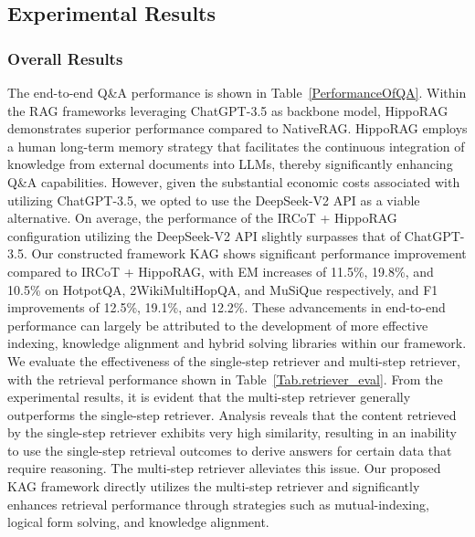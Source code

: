 \documentclass{article}
\begin{document}
\subsection{Experimental Results}

\subsubsection{Overall Results}
The end-to-end Q\&A performance is shown in Table~\ref{PerformanceOfQA}. Within the RAG frameworks leveraging ChatGPT-3.5 as backbone model, HippoRAG demonstrates superior performance compared to NativeRAG. HippoRAG employs a human long-term memory strategy that facilitates the continuous integration of knowledge from external documents into LLMs, thereby significantly enhancing Q\&A capabilities. However, given the substantial economic costs associated with utilizing ChatGPT-3.5, we opted to use the DeepSeek-V2 API as a viable alternative. On average, the performance of the IRCoT + HippoRAG configuration utilizing the DeepSeek-V2 API slightly surpasses that of ChatGPT-3.5. Our constructed framework KAG shows significant performance improvement compared to IRCoT + HippoRAG, with EM increases of 11.5\%, 19.8\%, and 10.5\% on HotpotQA, 2WikiMultiHopQA, and MuSiQue respectively, and F1 improvements of 12.5\%, 19.1\%, and 12.2\%. These advancements in end-to-end performance can largely be attributed to the development of more effective indexing, knowledge alignment and hybrid solving libraries within our framework.
We evaluate the effectiveness of the single-step retriever and multi-step retriever, with the retrieval performance shown in Table~\ref{Tab.retriever_eval}. From the experimental results, it is evident that the multi-step retriever generally outperforms the single-step retriever. Analysis reveals that the content retrieved by the single-step retriever exhibits very high similarity, resulting in an inability to use the single-step retrieval outcomes to derive answers for certain data that require reasoning. The multi-step retriever alleviates this issue. Our proposed KAG framework directly utilizes the multi-step retriever and significantly enhances retrieval performance through strategies such as mutual-indexing, logical form solving, and knowledge alignment. 
\end{document}
